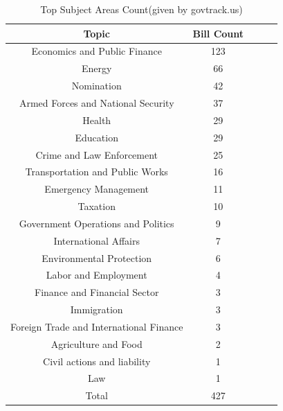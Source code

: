 \documentclass{article}
\begin{document}
\begin{table}[]
\centering
\vspace{-10pt}
\caption{\label{tbl: topics}Top Subject Areas Count(given by govtrack.us)}
\begin{tabular}{c c c c c}
\hline
Topic      & Bill Count    \\
\hline
Economics and Public Finance              & 123\\ 
Energy                                    &  66\\
Nomination                                &  42\\
Armed Forces and National Security        &  37\\
Health                                    &  29\\
Education                                 &  29\\
Crime and Law Enforcement                 &  25\\
Transportation and Public Works           &  16\\
Emergency Management                      &  11\\
Taxation                                  &  10\\
Government Operations and Politics        &   9\\
International Affairs                     &   7\\
Environmental Protection                  &   6\\
Labor and Employment                      &   4\\
Finance and Financial Sector              &   3\\
Immigration                               &   3\\
Foreign Trade and International Finance   &   3\\
Agriculture and Food                      &   2\\
Civil actions and liability               &   1\\
Law                                       &   1\\
\hline
Total                                     & 427\\
\hline
\end{tabular}
\end{table}
\end{document}
